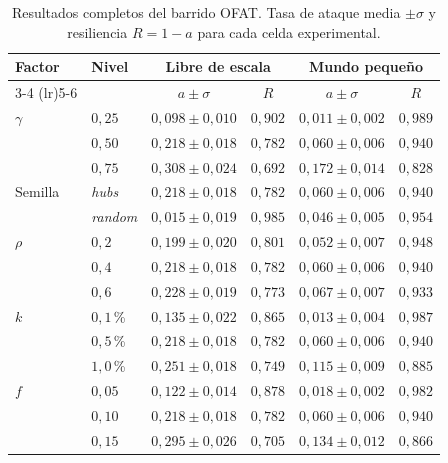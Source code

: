 \documentclass[12pt]{extarticle}
\numberwithin{equation}{section}
\begin{document}
\begin{table}[ht]
  \centering
  \small
  \caption{Resultados completos del barrido OFAT. Tasa de ataque media $\pm \sigma$ y resiliencia $R = 1 - a$ para cada celda experimental.}
  \label{tab:anexo-sweep}
  \begin{tabular}{@{}l l c c c c@{}}
    \toprule
    \textbf{Factor} & \textbf{Nivel} & \multicolumn{2}{c}{\textbf{Libre de escala}} & \multicolumn{2}{c}{\textbf{Mundo pequeño}} \\
    \cmidrule(lr){3-4} \cmidrule(lr){5-6}
    & & $a \pm \sigma$ & $R$ & $a \pm \sigma$ & $R$ \\
    \midrule
    $\gamma$ & $0{,}25$ & $0{,}098 \pm 0{,}010$ & $0{,}902$ & $0{,}011 \pm 0{,}002$ & $0{,}989$ \\
             & $0{,}50$ & $0{,}218 \pm 0{,}018$ & $0{,}782$ & $0{,}060 \pm 0{,}006$ & $0{,}940$ \\
             & $0{,}75$ & $0{,}308 \pm 0{,}024$ & $0{,}692$ & $0{,}172 \pm 0{,}014$ & $0{,}828$ \\
    \addlinespace
    Semilla & \emph{hubs} & $0{,}218 \pm 0{,}018$ & $0{,}782$ & $0{,}060 \pm 0{,}006$ & $0{,}940$ \\
            & \emph{random} & $0{,}015 \pm 0{,}019$ & $0{,}985$ & $0{,}046 \pm 0{,}005$ & $0{,}954$ \\
    \addlinespace
    $\rho$  & $0{,}2$ & $0{,}199 \pm 0{,}020$ & $0{,}801$ & $0{,}052 \pm 0{,}007$ & $0{,}948$ \\
            & $0{,}4$ & $0{,}218 \pm 0{,}018$ & $0{,}782$ & $0{,}060 \pm 0{,}006$ & $0{,}940$ \\
            & $0{,}6$ & $0{,}228 \pm 0{,}019$ & $0{,}773$ & $0{,}067 \pm 0{,}007$ & $0{,}933$ \\
    \addlinespace
    $k$     & $0{,}1$\,\% & $0{,}135 \pm 0{,}022$ & $0{,}865$ & $0{,}013 \pm 0{,}004$ & $0{,}987$ \\
            & $0{,}5$\,\% & $0{,}218 \pm 0{,}018$ & $0{,}782$ & $0{,}060 \pm 0{,}006$ & $0{,}940$ \\
            & $1{,}0$\,\% & $0{,}251 \pm 0{,}018$ & $0{,}749$ & $0{,}115 \pm 0{,}009$ & $0{,}885$ \\
    \addlinespace
    $f$     & $0{,}05$ & $0{,}122 \pm 0{,}014$ & $0{,}878$ & $0{,}018 \pm 0{,}002$ & $0{,}982$ \\
            & $0{,}10$ & $0{,}218 \pm 0{,}018$ & $0{,}782$ & $0{,}060 \pm 0{,}006$ & $0{,}940$ \\
            & $0{,}15$ & $0{,}295 \pm 0{,}026$ & $0{,}705$ & $0{,}134 \pm 0{,}012$ & $0{,}866$ \\

\end{tabular}
\end{table}
\end{document}

